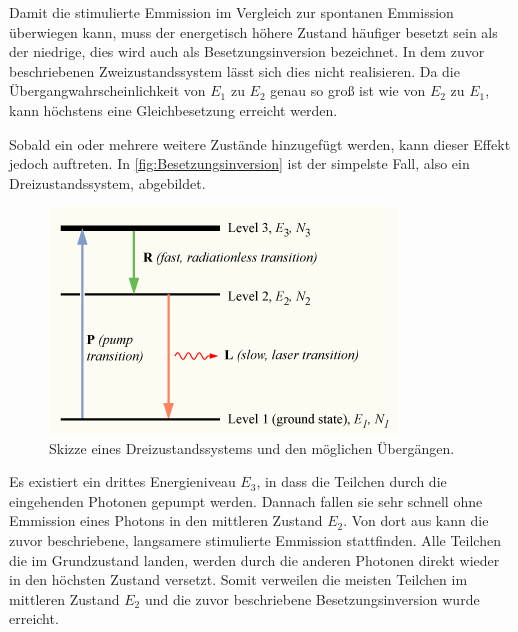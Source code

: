 Damit die stimulierte Emmission im Vergleich zur spontanen Emmission überwiegen kann, muss der energetisch
höhere Zustand häufiger besetzt sein als der niedrige, dies wird auch als Besetzungsinversion bezeichnet.
In dem zuvor beschriebenen Zweizustandssystem lässt sich dies nicht realisieren. Da die Übergangwahrscheinlichkeit
von $E_1$ zu $E_2$ genau so groß ist wie von $E_2$ zu $E_1$, kann höchstens
eine Gleichbesetzung erreicht werden.

Sobald ein oder mehrere weitere Zustände hinzugefügt werden, kann dieser Effekt jedoch auftreten.
In \autoref{fig:Besetzungsinversion} ist der simpelste Fall, also ein Dreizustandssystem, abgebildet.
\begin{figure}[H]
    \centering
    \includegraphics[height=6cm]{content/pics/besetzungsinversion.png}
    \caption{Skizze eines Dreizustandssystems und den möglichen Übergängen. \cite{Besetzungsinversion}}
    \label{fig:Besetzungsinversion}
\end{figure}
Es existiert ein drittes Energieniveau $E_3$, in dass die Teilchen durch die eingehenden Photonen gepumpt werden.
Dannach fallen sie sehr schnell ohne Emmission eines Photons in den mittleren Zustand $E_2$. Von dort aus kann
die zuvor beschriebene, langsamere stimulierte Emmission stattfinden. Alle Teilchen die im Grundzustand landen,
werden durch die anderen Photonen direkt wieder in den höchsten Zustand versetzt. Somit verweilen die meisten
Teilchen im mittleren Zustand $E_2$ und die zuvor beschriebene Besetzungsinversion wurde erreicht.

